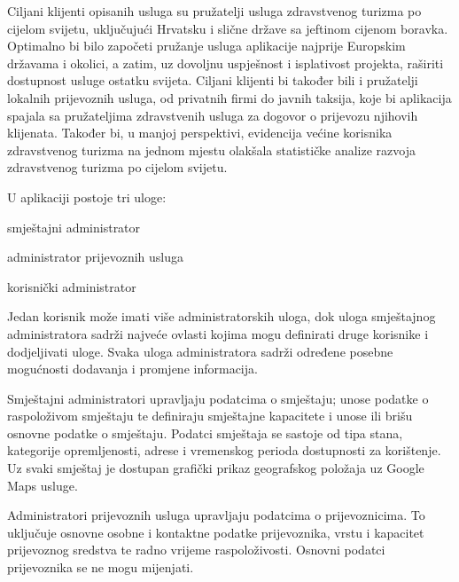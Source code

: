 		
		
		
		\break
		Ciljani klijenti opisanih usluga su pružatelji usluga zdravstvenog turizma po cijelom svijetu, uključujući Hrvatsku i slične države sa jeftinom cijenom boravka. Optimalno bi bilo započeti pružanje usluga aplikacije najprije Europskim državama i okolici, a zatim, uz dovoljnu uspješnost i isplativost projekta, raširiti dostupnost usluge ostatku svijeta. Ciljani klijenti bi također bili i pružatelji lokalnih prijevoznih usluga, od privatnih firmi do javnih taksija, koje bi aplikacija spajala sa pružateljima zdravstvenih usluga za dogovor o prijevozu njihovih klijenata. Također bi, u manjoj perspektivi, evidencija većine korisnika zdravstvenog turizma na jednom mjestu olakšala statističke analize razvoja zdravstvenog turizma po cijelom svijetu.
		
		\medskip
		U aplikaciji postoje tri uloge:
		\begin{packed_item}
			\item  smještajni administrator
			\item  administrator prijevoznih usluga
			\item  korisnički administrator
		\end{packed_item}
		
		Jedan korisnik može imati više administratorskih uloga, dok uloga smještajnog administratora sadrži najveće ovlasti kojima mogu definirati druge korisnike i dodjeljivati uloge. Svaka uloga administratora sadrži određene posebne mogućnosti dodavanja i promjene informacija.
		
		\smallskip
		Smještajni administratori upravljaju podatcima o smještaju; unose podatke o raspoloživom smještaju te definiraju smještajne kapacitete i unose ili brišu osnovne podatke o smještaju. Podatci smještaja se sastoje od tipa stana, kategorije opremljenosti, adrese i vremenskog perioda dostupnosti za korištenje. Uz svaki smještaj je dostupan grafički prikaz geografskog položaja uz Google Maps usluge.
		
		Administratori prijevoznih usluga upravljaju podatcima o prijevoznicima. To uključuje osnovne osobne i kontaktne podatke prijevoznika, vrstu i kapacitet prijevoznog sredstva te radno vrijeme raspoloživosti. Osnovni podatci prijevoznika se ne mogu mijenjati.
		
